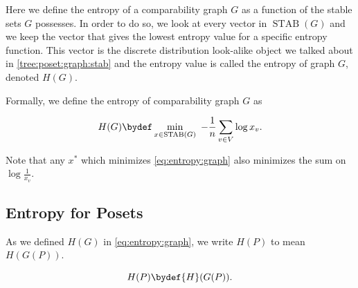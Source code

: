 Here we define the entropy of a comparability graph $G$ as a function of the
stable sets $G$ possesses. In order to do so, we look at every vector in
$\operatorname{STAB}(G)$ and we keep the vector that gives the lowest entropy
value for a specific entropy function. This vector is the discrete distribution
look-alike object we talked about in \ref{tree:poset:graph:stab} and the
entropy value is called the entropy of graph $G$, denoted ${H}(G)$.

Formally, we define the entropy of comparability graph $G$ as

\begin{equation}
{H}(G) \bydef \min_{x \in \operatorname{STAB}(G)}~ -\frac{1}{n} \sum_{v \in
V} \log x_v.
\label{eq:entropy:graph}
\end{equation}

Note that any $x^*$ which minimizes \ref{eq:entropy:graph} also minimizes the
sum on $\log \frac{1}{x_v}$.



\subsection*{Entropy for Posets}


As we defined ${H}(G)$ in \ref{eq:entropy:graph}, we write ${H}(P)$ to mean
${H}(G(P))$.

\begin{equation}
{H}(P) \bydef {H}({G}(P)).
\label{eq:entropy:poset}
\end{equation}
